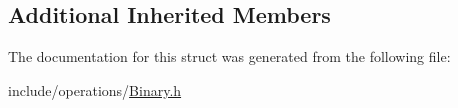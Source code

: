 \subsection*{Additional Inherited Members}


The documentation for this struct was generated from the following file\+:\begin{DoxyCompactItemize}
\item 
include/operations/\hyperlink{Binary_8h}{Binary.\+h}\end{DoxyCompactItemize}
